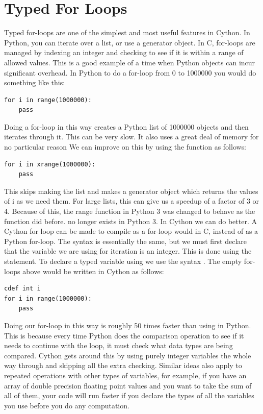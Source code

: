 \section*{Typed For Loops}

Typed for-loops are one of the simplest and most useful features in Cython.
In Python, you can iterate over a list, or use a generator object.
In C, for-loops are managed by indexing an integer and checking to see if it is within a range of allowed values.
This is a good example of a time when Python objects can incur significant overhead.
In Python to do a for-loop from 0 to 1000000 you would do something like this:
\begin{lstlisting}
for i in range(1000000):
    pass
\end{lstlisting}
Doing a for-loop in this way creates a Python list of 1000000 objects and then iterates through it.
This can  be very slow.
It also uses a great deal of memory for no particular reason
We can improve on this by using the  function as follows:
\begin{lstlisting}
for i in xrange(1000000):
	pass
\end{lstlisting}
This skips making the list and makes a generator object which returns the values of i as we need them.
For large lists, this can give us a speedup of a factor of 3 or 4.
Because of this, the range function in Python 3 was changed to behave as the  function did before.
 no longer exists in Python 3.
In Cython we can do better.
A Cython for loop can be made to compile as a for-loop would in C, instead of as a Python for-loop.
The syntax is essentially the same, but we must first declare that the variable we are using for iteration is an integer.
This is done using the  statement.
To declare a typed variable using  we use the syntax .
The empty for-loops above would be written in Cython as follows:
\begin{lstlisting}
cdef int i
for i in range(1000000):
	pass
\end{lstlisting}
Doing our for-loop in this way is roughly 50 times faster than using  in Python.
This is because every time Python does the comparison operation to see if it needs to continue with the loop, it must check what data types are being compared.
Cython gets around this by using purely integer variables the whole way through and skipping all the extra checking.
Similar ideas also apply to repeated operations with other types of variables, for example, if you have an array of double precision floating point values and you want to take the sum of all of them, your code will run faster if you declare the types of all the variables you use before you do any computation.
